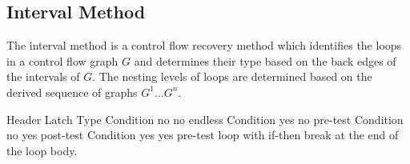 
\subsection{Interval Method}
\label{sec:interval_method}


The interval method is a control flow recovery method which identifies the loops in a control flow graph $G$ and determines their type based on the back edges of the intervals of $G$. The nesting levels of loops are determined based on the derived sequence of graphs $G^1 \dots G^n$.







             Header   Latch    Type
Condition    no       no       endless
Condition    yes      no       pre-test
Condition    no       yes      post-test
Condition    yes      yes      pre-test loop with if-then break at the end of the loop body.




